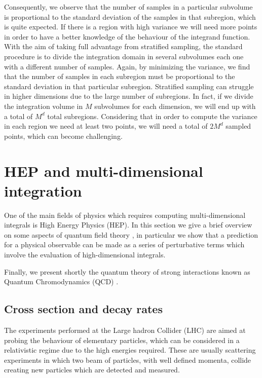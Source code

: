 \documentclass[../main/main.tex]{subfiles}
\begin{document}
Consequently, we observe that the number of samples in a particular subvolume is proportional to the standard deviation of the samples in that subregion, which is quite expected. If there is a region with high variance we will need more points in order to have a better knowledge of the behaviour of the 
integrand function.
\newline
With the aim of taking full advantage from stratified sampling, the standard procedure is to divide
the integration domain in several subvolumes each one with a different number of samples. Again, by minimizing the variance, we find that the number of samples in each subregion must be proportional
to the standard deviation in that particular subregion.
\newline
Stratified sampling can struggle in higher dimensions due to the large number of subregions.
In fact, if we divide the integration volume in $M$ subvolumes for each dimension, we will end up with a total of $M^d$  total subregions. Considering that in order to compute the variance in each region we need at least two points, we will need a total of $2 M^d$ sampled points, which can become challenging.



\section{HEP and multi-dimensional integration}
One of the main fields of physics which requires computing multi-dimensional integrals is High Energy Physics (HEP).
In this section we give a brief overview on some aspects of quantum field theory \cite{Peskin:1995ev, Schwartz:2017hep}, in particular we show that a prediction for a physical
observable can be made as a series of perturbative terms which involve the evaluation of high-dimensional integrals.

Finally, we present shortly the quantum theory of strong interactions known as Quantum Chromodynamics (QCD) \cite{Collins:2011zzd, Muta:2010xua, Ellis:1991qj, Skands:2012ts}.


\subsection{Cross section and decay rates}
The experiments performed at the Large hadron Collider (LHC) \cite{Aad:2008zzm, Chatrchyan:2008aa} are aimed at probing the behaviour of elementary particles, which can be considered in a 
relativistic regime due to the high energies required. These are usually scattering experiments in which two beam of particles, with well defined momenta, collide creating new particles which are detected and measured.
\end{document}
